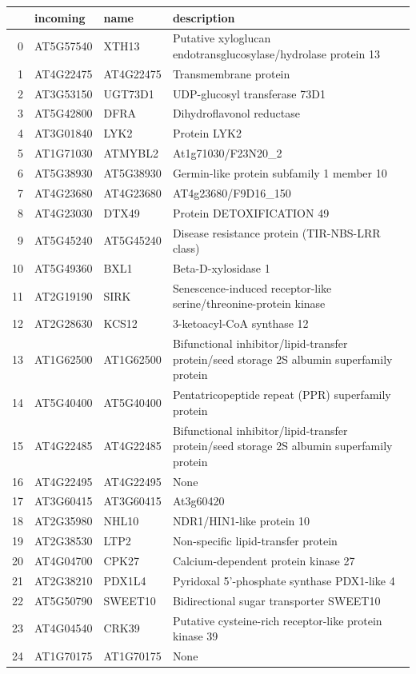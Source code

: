 \documentclass[11pt]{article}
\begin{document}
\begin{center}
\begin{tabular}{rlll}
 & incoming & name & description\\
\hline
0 & AT5G57540 & XTH13 & Putative xyloglucan endotransglucosylase/hydrolase protein 13\\
1 & AT4G22475 & AT4G22475 & Transmembrane protein\\
2 & AT3G53150 & UGT73D1 & UDP-glucosyl transferase 73D1\\
3 & AT5G42800 & DFRA & Dihydroflavonol reductase\\
4 & AT3G01840 & LYK2 & Protein LYK2\\
5 & AT1G71030 & ATMYBL2 & At1g71030/F23N20\_2\\
6 & AT5G38930 & AT5G38930 & Germin-like protein subfamily 1 member 10\\
7 & AT4G23680 & AT4G23680 & AT4g23680/F9D16\_150\\
8 & AT4G23030 & DTX49 & Protein DETOXIFICATION 49\\
9 & AT5G45240 & AT5G45240 & Disease resistance protein (TIR-NBS-LRR class)\\
10 & AT5G49360 & BXL1 & Beta-D-xylosidase 1\\
11 & AT2G19190 & SIRK & Senescence-induced receptor-like serine/threonine-protein kinase\\
12 & AT2G28630 & KCS12 & 3-ketoacyl-CoA synthase 12\\
13 & AT1G62500 & AT1G62500 & Bifunctional inhibitor/lipid-transfer protein/seed storage 2S albumin superfamily protein\\
14 & AT5G40400 & AT5G40400 & Pentatricopeptide repeat (PPR) superfamily protein\\
15 & AT4G22485 & AT4G22485 & Bifunctional inhibitor/lipid-transfer protein/seed storage 2S albumin superfamily protein\\
16 & AT4G22495 & AT4G22495 & None\\
17 & AT3G60415 & AT3G60415 & At3g60420\\
18 & AT2G35980 & NHL10 & NDR1/HIN1-like protein 10\\
19 & AT2G38530 & LTP2 & Non-specific lipid-transfer protein\\
20 & AT4G04700 & CPK27 & Calcium-dependent protein kinase 27\\
21 & AT2G38210 & PDX1L4 & Pyridoxal 5'-phosphate synthase PDX1-like 4\\
22 & AT5G50790 & SWEET10 & Bidirectional sugar transporter SWEET10\\
23 & AT4G04540 & CRK39 & Putative cysteine-rich receptor-like protein kinase 39\\
24 & AT1G70175 & AT1G70175 & None\\
\end{tabular}
\end{center}
\end{document}
